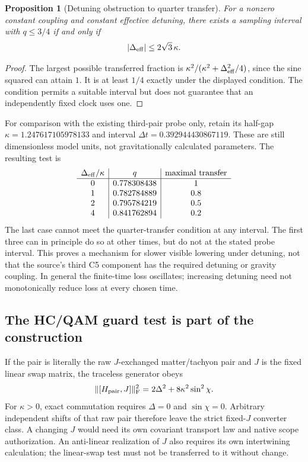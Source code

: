 \documentclass[11pt,a4paper]{article}
\newtheorem{proposition}{Proposition}
\begin{document}
\begin{proposition}[Detuning obstruction to quarter transfer]
For a nonzero constant coupling and constant effective detuning,
there exists a sampling interval with $q\le3/4$ if and only if
\[
 |\Delta_{\rm eff}|\le2\sqrt3\,\kappa.
\]
\end{proposition}
\begin{proof}
The largest possible transferred fraction is
$\kappa^2/(\kappa^2+\Delta_{\rm eff}^2/4)$, since the sine squared
can attain $1$. It is at least $1/4$ exactly under the displayed
condition. The condition permits a suitable interval but does not
guarantee that an independently fixed clock uses one.
\end{proof}

For comparison with the existing third-pair probe only, retain its
half-gap $\kappa=1.247617105978133$ and interval
$\Delta t=0.392944430867119$. These are still dimensionless model
units, not gravitationally calculated parameters. The resulting
test is
\[
\begin{array}{c|c|c}
\Delta_{\rm eff}/\kappa&q&\text{maximal transfer}\\
\hline
0&0.778308438&1\\
1&0.782784889&0.8\\
2&0.795784219&0.5\\
4&0.841762894&0.2
\end{array}
\]
The last case cannot meet the quarter-transfer condition at any
interval. The first three can in principle do so at other times,
but do not at the stated probe interval. This proves a mechanism
for slower visible lowering under detuning, not that the source's
third C5 component has the required detuning or gravity coupling.
In general the finite-time loss oscillates; increasing detuning
need not monotonically reduce loss at every chosen time.

\subsection{The HC/QAM guard test is part of the construction}
If the pair is literally the raw $J$-exchanged matter/tachyon pair
and $J$ is the fixed linear swap matrix, the traceless generator obeys
\[
 \|[H_{\rm pair},J]\|_{\rm F}^2
 =2\Delta^2+8\kappa^2\sin^2\chi.
\]
For $\kappa>0$, exact commutation requires $\Delta=0$ and
$\sin\chi=0$. Arbitrary independent shifts of that raw pair
therefore leave the strict fixed-$J$ converter class. A changing
$J$ would need its own covariant transport law and native scope
authorization. An anti-linear realization of $J$ also requires
its own intertwining calculation; the linear-swap test must not
be transferred to it without change.
\end{document}
